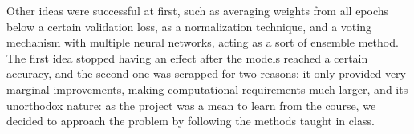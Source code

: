 \documentclass[11pt]{article}
\begin{document}
\begin{multicols}{2}
      Other ideas were successful at first, such as averaging weights from all epochs 
      below a certain validation loss, as a normalization technique, and a voting mechanism 
      with multiple neural networks, acting as a sort of ensemble method. The first idea
      stopped having an effect after the models reached a certain accuracy, and the second
      one was scrapped for two reasons: it only provided very marginal improvements, 
      making computational requirements much larger, and its unorthodox nature: as the 
      project was a mean to learn from the course, we decided to approach the problem by 
      following the methods taught in class.





\end{multicols}
\end{document}
